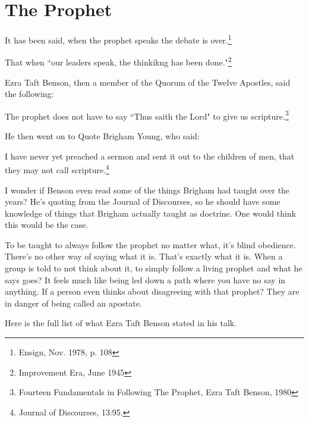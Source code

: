 \chapter{The Prophet}

It has been said, when the prophet speaks the debate is over.\footnote{
Ensign, Nov. 1978, p. 108
}

That when ``our leaders speak, the thinkikng has been done."\footnote{Improvement 
Era, June 1945}

Ezra Taft Benson, then a member of the Quorum of the Twelve Apostles, said the
following:

\begin{displayquote}
The prophet does not have to say ``Thus saith the Lord" to give us
scripture.\footnote{Fourteen Fundamentals in Following The Prophet, Ezra Taft 
Benson, 1980}
\end{displayquote}

He then went on to Quote Brigham Young, who said:

\begin{displayquote}
I have never yet preached a sermon and sent it out to the children of men, that 
they may not call scripture.\footnote{Journal of Discourses, 13:95.}
\end{displayquote}

I wonder if Benson even read some of the things Brigham had taught over the years?
He's quoting from the Journal of Discourses, so he should have some knowledge of
things that Brigham actually taught as doctrine. One would think this would be the
case.

To be taught to always follow the prophet no matter what, it's blind obedience.
There's no other way of saying what it is. That's exactly what it is. When a group is
told to not think about it, to simply follow a living prophet and what he says goes?
It feels much like being led down a path where you have no say in anything. If a
person even thinks about disagreeing with that prophet? They are in danger of being
called an apostate.

Here is the full list of what Ezra Taft Benson stated in his talk.

